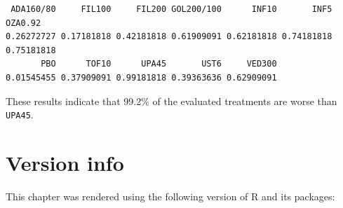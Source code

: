\documentclass[
  letterpaper,
  DIV=11,
  numbers=noendperiod]{scrreprt}
\begin{document}
\begin{verbatim}
 ADA160/80     FIL100     FIL200 GOL200/100      INF10       INF5    OZA0.92 
0.26272727 0.17181818 0.42181818 0.61909091 0.62181818 0.74181818 0.75181818 
       PBO      TOF10      UPA45       UST6     VED300 
0.01545455 0.37909091 0.99181818 0.39363636 0.62909091 
\end{verbatim}

These results indicate that 99.2\% of the evaluated treatments are worse
than \texttt{UPA45}.

\hypertarget{version-info-4}{%
\section*{Version info}\label{version-info-4}}


This chapter was rendered using the following version of R and its
packages:
\end{document}
